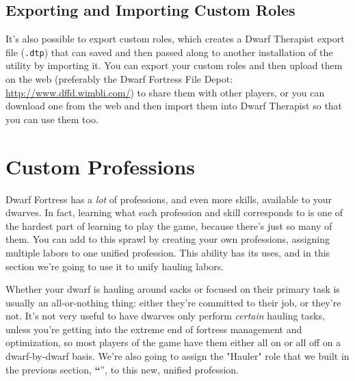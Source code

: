 \documentclass[]{article}
\newcommand{\jump}[1] {\textbf{``\nameref{sec:#1}}''}
\begin{document}
\subsection{Exporting and Importing Custom Roles}
It's also possible to export custom roles, which creates a Dwarf Therapist export file (\texttt{.dtp})
that can saved and then passed along to another installation of the utility by importing it. You can
export your custom roles and then upload them on the web (preferably the Dwarf Fortress File Depot:
\url{http://www.dffd.wimbli.com/}) to share them with other players, or you can download one from the web
and then import them into Dwarf Therapist so that you can use them too.

\section{Custom Professions}
Dwarf Fortress has a \emph{lot} of professions, and even more skills, available to your dwarves. In fact,
learning what each profession and skill corresponds to is one of the hardest part of learning to play
the game, because there's just so many of them. You can add to this sprawl by creating your own
professions, assigning multiple labors to one unified profession. This ability has its uses, and in this
section we're going to use it to unify hauling labors.

Whether your dwarf is hauling around sacks or focused on their primary task is usually an all-or-nothing
thing: either they're committed to their job, or they're not. It's not very useful to have dwarves only
perform \emph{certain} hauling tasks, unless you're getting into the extreme end of fortress management
and optimization, so most players of the game have them either all on or all off on a dwarf-by-dwarf
basis. We're also going to assign the "Hauler" role that we built in the previous section,
\jump{Creating Custom Roles}, to this new, unified profession.
\end{document}
